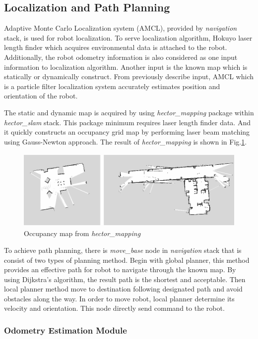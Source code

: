 \documentclass{llncs}
\begin{document}
\subsection{Localization and Path Planning}

Adaptive Monte Carlo Localization system (AMCL), provided by \textit{navigation} stack, is used for robot localization. To serve localization algorithm, Hokuyo laser length finder which acquires environmental data is attached to the robot. Additionally, the robot odometry information is also considered as one input information to localization algorithm. Another input is the known map which is statically or dynamically construct. From previously describe input, AMCL which is a particle filter localization system accurately estimates position and orientation of the robot.

The static and dynamic map is acquired by using \textit{hector\_mapping} package within \textit{hector\_slam} stack. This package minimum requires laser length finder data. And it quickly constructs an occupancy grid map by performing laser beam matching using Gauss-Newton approach\cite{hector_slam}. The result of \textit{hector\_mapping} is shown in Fig.\ref{fig:hector}.

\begin{figure}
\centering
\includegraphics[height=3.9cm]{hector_map}
\caption{Occupancy map from \textit{hector\_mapping}}
\label{fig:hector}
\end{figure}

To achieve path planning, there is \textit{move\_base} node in \textit{navigation} stack that is consist of two types of planning method. Begin with global planner, this method provides an effective path for robot to navigate through the known map. By using Dijkstra's algorithm, the result path is the shortest and acceptable. Then local planner method move to destination following designated path and avoid obstacles along the way. In order to move robot, local planner determine its velocity and orientation. This node directly send command to the robot.

\subsubsection{Odometry Estimation Module}
\end{document}
